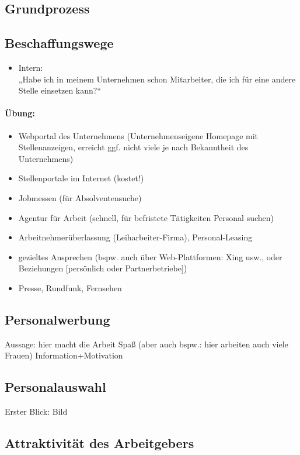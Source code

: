 \subsection{Grundprozess}
\subsection{Beschaffungswege}
\begin{itemize}
\item Intern:\\
„Habe ich in meinem Unternehmen schon Mitarbeiter, die ich für eine andere Stelle einsetzen kann?“
\end{itemize}

\paragraph{Übung:}
\begin{itemize}
\item Webportal des Unternehmens (Unternehmenseigene Homepage mit Stellenanzeigen, erreicht ggf. nicht viele je nach Bekanntheit des Unternehmens)
\item Stellenportale im Internet (kostet!)
\item Jobmessen (für Absolventensuche)
\item Agentur für Arbeit (schnell, für befristete Tätigkeiten Personal suchen)
\item Arbeitnehmerüberlassung (Leiharbeiter-Firma), Personal-Leasing
\item gezieltes Ansprechen (bspw. auch über Web-Plattformen: Xing usw., oder Beziehungen [persönlich oder Partnerbetriebe])
\item Presse, Rundfunk, Fernsehen
\end{itemize}
\subsection{Personalwerbung}
Aussage: hier macht die Arbeit Spaß (aber auch bspw.: hier arbeiten auch viele Frauen)
Information+Motivation
\subsection{Personalauswahl}
Erster Blick: Bild
\subsection{Attraktivität des Arbeitgebers}
